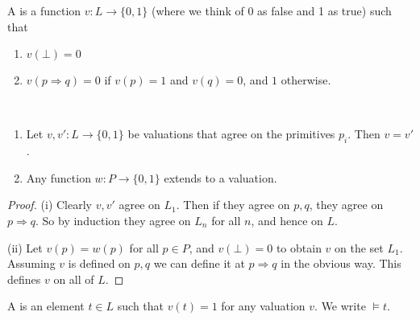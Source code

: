 \documentclass[a4paper, 10pt, twocolumn]{amsart}
\newcommand{\enumpre}{\vspace{-1.5\baselineskip}}
\begin{document}
\begin{definition}[Valuation]
  A  is a function $v : L \rightarrow \{0, 1\}$ (where we think of $0$ as false and 1 as true) such that
  \begin{enumerate}
    \item $v(\bot) = 0$
    \item $v(p \Rightarrow q) = 0$ if $v(p) = 1$ and $v(q) = 0$, and $1$ otherwise.
  \end{enumerate}
\end{definition}


\begin{proposition}~
  \enumpre
  \begin{enumerate}[label=(\roman*)]
    \item Let $v, v' : L \rightarrow \{0, 1\}$ be valuations that agree on the primitives $p_i$. Then $v = v'$.
    \item Any function $w: P \rightarrow \{0, 1\}$ extends to a valuation.
  \end{enumerate}
\end{proposition}
    
\begin{proof}(i) Clearly $v, v'$ agree on $L_1$. Then if they agree on $p, q$, they agree on $p \Rightarrow q$. So by induction they agree on $L_n$ for all $n$, and hence on $L$.

  (ii) Let $v(p) = w(p)$ for all $p \in P$, and $v(\bot) = 0$ to obtain $v$ on the set $L_1$. Assuming $v$ is defined on $p, q$ we can define it at $p\Rightarrow q$ in the obvious way. This defines $v$ on all of $L$.
\end{proof}

\begin{definition}[Tautology]
  A  is an element $t \in L$ such that $v(t) = 1$ for any valuation $v$. We write $\models t$.
\end{definition}
\end{document}
